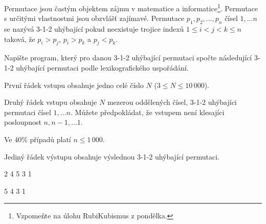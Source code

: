 





Permutace jsou častým objektem zájmu v matematice a informatice\footnote{Vzpomeňte na úlohu RubiKubismus z pondělka.}.
Permutace s určitými vlastnostmi jsou obzvlášť zajímavé.
Permutace $p_1,p_2, \ldots, p_n$ čísel $1, \ldots n$ se nazývá 3-1-2 uhýbající pokud neexistuje trojice indexů $1\leq i<j<k \leq n$ taková, že $p_i>p_j$,  $p_i>p_k$ a $p_j<p_k$.


Napište program, který pro danou 3-1-2 uhýbající permutaci spočte následující 3-1-2 uhýbající permutaci podle lexikografického uspořádání.


První řádek vstupu obsahuje jedno celé číslo $N$ ($3 \leq N \leq 10\,000$).

Druhý řádek vstupu obsahuje $N$ mezerou oddělených čísel, 3-1-2 uhýbajíci permutaci čísel $1, \ldots n$.
Múžete předpokládat, že vstupem není klesajíci posloupnost $n, n-1, \ldots 1$.

\smallskip

Ve $40\%$ případů platí $n \leq 1\,000$.


Jediný řádek výstupu obsahuje výslednou 3-1-2 uhýbající permutaci.


2 4 5 3 1

 5 4 3 1
\sampleCOMMENT

\sampleEND
\bigskip



